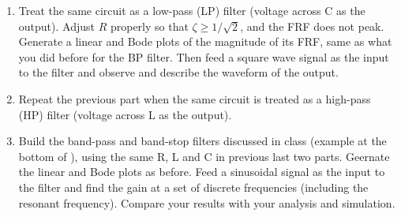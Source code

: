 \begin{enumerate}
  \begin{comment}
  {\bf Solution:} Use $C=0.1\,\mu F$, $L=4.7\,mH$ with internal resistance 
  $R_L=27\,\Omega$, and $R=10\,\Omega$, $\omega_n=1/\sqrt{LC}=4.6\times 10^4$,
  $Q=\omega_nL/(R+R_L)=5.86$, $\zeta=1/2Q=0.0853$, 
  $\Delta\,\omega=\omega_n/Q=7.87\times 10^3$, $f_n=\omega_n/2\pi=7.34\times 10^3$,
  $\Delta f=\Delta\omega/2\pi=7.34\;kHz$.
  \htmladdimg{../RLCfilterFig1.png}

  \end{comment}



\item Treat the same circuit as a low-pass (LP) filter (voltage across C as the output).
  Adjust $R$ properly so that $\zeta\ge 1/\sqrt{2}$, and the FRF does not peak. 
  Generate a linear and Bode plots of the magnitude of its FRF, same as what you did 
  before for the BP filter. Then feed a square wave signal as the input to the filter 
  and observe and describe the waveform of the output.


  \begin{comment}
  {\bf Solution:} Use $R=280\,\Omega$, $\zeta=(R_L+R)\sqrt{C/L}/2=0.708$
  \htmladdimg{../RLCfilterFig2.png}

  \end{comment}


\item Repeat the previous part when the same circuit is treated as a high-pass (HP) 
  filter (voltage across L as the output).

\item Build the band-pass and band-stop filters discussed in class 
  (example at the bottom of ),
  using the same R, L and C in previous last two parts. Geernate the linear and Bode plots 
  as before. Feed a sinusoidal signal as the input to the filter and find the gain at a
  set of discrete frequencies (including the resonant frequency). Compare your results 
  with your analysis and simulation.

  \begin{comment}

  \htmladdimg{../RLCfilterFig3.png}
  \end{comment}


\end{enumerate}

  
